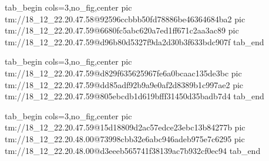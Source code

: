  
 
 
 
 

\qqSecCmtScr


\ifcmt
  tab_begin cols=3,no_fig,center
    pic tm://18_12_22.20.47.58@92596ccbbb50fd78886be46364684ba2
    pic tm://18_12_22.20.47.59@6680fc5abc620a7ed1ff671c2aa3ac89
    pic tm://18_12_22.20.47.59@d96b80d5327f9da2d30b3f633bdc907f
  tab_end
\fi


\ifcmt
  tab_begin cols=3,no_fig,center
    pic tm://18_12_22.20.47.59@d829f635625967fe6a0bcaac135de3bc
    pic tm://18_12_22.20.47.59@dd85adf92b9a9e0af2d8389b1c997ae2
    pic tm://18_12_22.20.47.59@805ebcdb1d619bfff31450d35badb7d4
  tab_end
\fi


\ifcmt
  tab_begin cols=3,no_fig,center
    pic tm://18_12_22.20.47.59@15d18809d2ac57edce23ebc13b84277b
    pic tm://18_12_22.20.48.00@73998cbb32e6abc946adeb975e7c6295
    pic tm://18_12_22.20.48.00@d3eeeb565741f38139ac7b932cf0ec94
  tab_end
\fi

